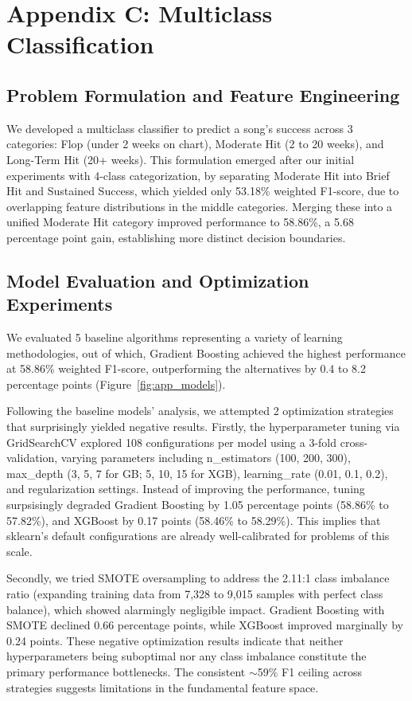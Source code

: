 \documentclass{article}
\begin{document}
\section*{Appendix C: Multiclass Classification}

\subsection*{Problem Formulation and Feature Engineering}
We developed a multiclass classifier to predict a song's success across 3 categories: Flop (under 2 weeks on chart), Moderate Hit (2 to 20 weeks), and Long-Term Hit (20+ weeks). This formulation emerged after our initial experiments with 4-class categorization, by separating Moderate Hit into Brief Hit and Sustained Success, which yielded only 53.18\% weighted F1-score, due to overlapping feature distributions in the middle categories. Merging these into a unified Moderate Hit category improved performance to 58.86\%, a 5.68 percentage point gain, establishing more distinct decision boundaries.

\subsection*{Model Evaluation and Optimization Experiments}
We evaluated 5 baseline algorithms representing a variety of learning methodologies, out of which, Gradient Boosting achieved the highest performance at 58.86\% weighted F1-score, outperforming the alternatives by 0.4 to 8.2 percentage points (Figure~\ref{fig:app_models}).

Following the baseline models' analysis, we attempted 2 optimization strategies that surprisingly yielded negative results. Firstly, the hyperparameter tuning via GridSearchCV explored 108 configurations per model using a 3-fold cross-validation, varying parameters including n\_estimators (100, 200, 300), max\_depth (3, 5, 7 for GB; 5, 10, 15 for XGB), learning\_rate (0.01, 0.1, 0.2), and regularization settings. Instead of improving the performance, tuning surpsisingly degraded Gradient Boosting by 1.05 percentage points (58.86\% to 57.82\%), and XGBoost by 0.17 points (58.46\% to 58.29\%). This implies that sklearn's default configurations are already well-calibrated for problems of this scale.

Secondly, we tried SMOTE oversampling to address the 2.11:1 class imbalance ratio (expanding training data from 7,328 to 9,015 samples with perfect class balance), which showed alarmingly negligible impact. Gradient Boosting with SMOTE declined 0.66 percentage points, while XGBoost improved marginally by 0.24 points. These negative optimization results indicate that neither hyperparameters being suboptimal nor any class imbalance constitute the primary performance bottlenecks. The consistent $\sim$59\% F1 ceiling across strategies suggests limitations in the fundamental feature space.
\end{document}

